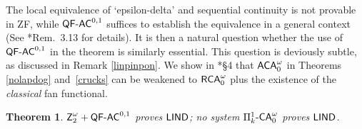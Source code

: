 \documentclass[reqno]{amsart}
\newcommand{\Z}{{\textsf{\textup{Z}}}}
\newtheorem{thm}{Theorem}
\def\SIXK{\Pi_{k}^{1}\text{-\textsf{\textup{CA}}}_{0}^{\omega}}
\def\RCAo{\textup{\textsf{RCA}}_{0}^{\omega}}
\def\ACAo{\textup{\textsf{ACA}}_{0}^{\omega}}
\def\WKL{\textup{\textsf{WKL}}}
\def\asa{\leftrightarrow}
\def\QFAC{\textup{\textsf{QF-AC}}}
\def\HBU{\textup{\textsf{HBU}}}
\def\LIND{\textup{\textsf{LIND}}}
\def\LIN{\textup{\textsf{LIN}}}
\numberwithin{equation}{section}
\numberwithin{thm}{section}
\begin{document}
The local equivalence of `epsilon-delta' and sequential continuity is not provable in \textsf{ZF}, while $\QFAC^{0,1}$ suffices to establish the equivalence in a general context (See \cite{kohlenbach2}*{Rem.\ 3.13} for details).  
It is then a natural question whether the use of $\QFAC^{0,1}$ in the theorem is similarly essential.  
This question is deviously subtle, as discussed in Remark \ref{linpinpon}.
We show in \cite{dagsamV}*{\S4} that $\ACAo$ in Theorems \ref{nolapdog} and~\ref{crucks} can be weakened to $\RCAo$ plus the existence of the \emph{classical} fan functional.  %
%
%
\begin{thm}\label{main2}
 $\Z_{2}^{\omega}+\QFAC^{0,1}$ proves $\LIND$; no system $\SIXK$ proves $\LIND$.  
\end{thm}
\end{document}

